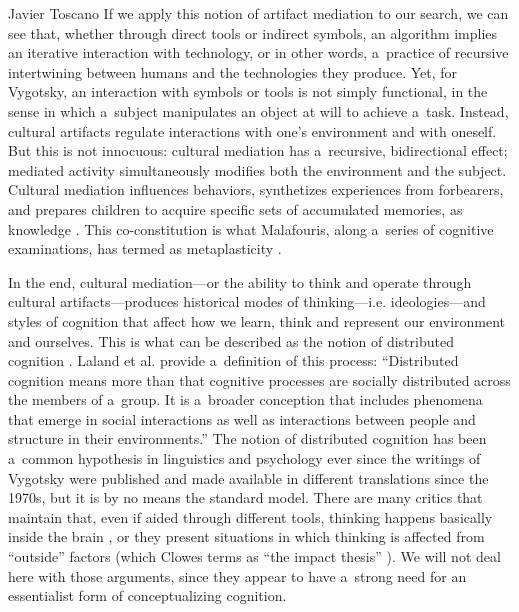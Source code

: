 \begin{artengenv}{Javier Toscano}
If we apply this notion of artifact mediation to our search, we can see that, whether through direct tools or indirect symbols, an algorithm implies an iterative interaction with technology, or in other words, a~practice of recursive intertwining between humans and the technologies they produce. Yet, for Vygotsky, an interaction with symbols or tools is not simply functional, in the sense in which a~subject manipulates an object at will to achieve a~task. Instead, cultural artifacts regulate interactions with one's environment and with oneself. But this is not innocuous: cultural mediation has a~recursive, bidirectional effect; mediated activity simultaneously modifies both the environment and the subject. Cultural mediation influences behaviors, synthetizes experiences from forbearers, and prepares children to acquire specific sets of accumulated memories, as knowledge
\parencite[see here also][]{connerton_how_1989}. %
 This co-constitution is what Malafouris, along a~series of cognitive examinations, has termed as metaplasticity 
\parencites[][]{malafouris_metaplasticity_2010}[][]{malafouris_how_2013}[][]{malafouris_metaplasticity_2015}.%


In the end, cultural mediation---or the ability to think and operate through cultural artifacts---produces historical modes of thinking---i.e. ideologies---and styles of cognition that affect how we learn, think and represent our environment and ourselves. This is what can be described as the notion of distributed cognition
\parencites[][]{salomon_cultural-historical_1993}[][]{gallagher_how_2005}[][]{gallagher_socially_2013}. %
 Laland et al. 
\parencite*[][p.177]{laland_niche_2000} %
 provide a~definition of this process: ``Distributed cognition means more than that cognitive processes are socially distributed across the members of a~group. It is a~broader conception that includes phenomena that emerge in social interactions as well as interactions between people and structure in their environments.'' The notion of distributed cognition has been a~common hypothesis in linguistics and psychology ever since the writings of Vygotsky were published and made available in different translations since the 1970s, but it is by no means the standard model. There are many critics that maintain that, even if aided through different tools, thinking happens basically inside the brain 
\parencites[][]{adams_bounds_2008}[][]{menary_defending_2010}[][]{loh_how_2016}, %
 or they present situations in which thinking is affected from ``outside'' factors (which Clowes
 \parencite*[][]{clowes_screen_2019}%
 terms as ``the impact thesis''%
). We will not deal here with those arguments, since they appear to have a~strong need for an essentialist form of conceptualizing cognition.


\end{artengenv}
